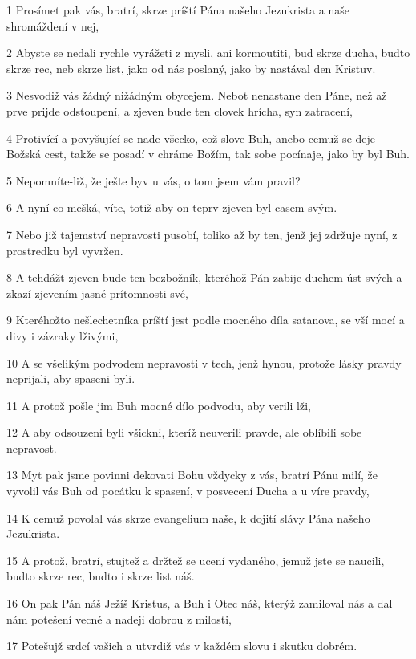 \par 1 Prosímet pak vás, bratrí, skrze príští Pána našeho Jezukrista a naše shromáždení v nej,
\par 2 Abyste se nedali rychle vyrážeti z mysli, ani kormoutiti, bud skrze ducha, budto skrze rec, neb skrze list, jako od nás poslaný, jako by nastával den Kristuv.
\par 3 Nesvodiž vás žádný nižádným obycejem. Nebot nenastane den Páne, než až prve prijde odstoupení, a zjeven bude ten clovek hrícha, syn zatracení,
\par 4 Protivící a povyšující se nade všecko, což slove Buh, anebo cemuž se deje Božská cest, takže se posadí v chráme Božím, tak sobe pocínaje, jako by byl Buh.
\par 5 Nepomníte-liž, že ješte byv u vás, o tom jsem vám pravil?
\par 6 A nyní co mešká, víte, totiž aby on teprv zjeven byl casem svým.
\par 7 Nebo již tajemství nepravosti pusobí, toliko až by ten, jenž jej zdržuje nyní, z prostredku byl vyvržen.
\par 8 A tehdážt zjeven bude ten bezbožník, kteréhož Pán zabije duchem úst svých a zkazí zjevením jasné prítomnosti své,
\par 9 Kteréhožto nešlechetníka príští jest podle mocného díla satanova, se vší mocí a divy i zázraky lživými,
\par 10 A se všelikým podvodem nepravosti v tech, jenž hynou, protože lásky pravdy neprijali, aby spaseni byli.
\par 11 A protož pošle jim Buh mocné dílo podvodu, aby verili lži,
\par 12 A aby odsouzeni byli všickni, kteríž neuverili pravde, ale oblíbili sobe nepravost.
\par 13 Myt pak jsme povinni dekovati Bohu vždycky z vás, bratrí Pánu milí, že vyvolil vás Buh od pocátku k spasení, v posvecení Ducha a u víre pravdy,
\par 14 K cemuž povolal vás skrze evangelium naše, k dojití slávy Pána našeho Jezukrista.
\par 15 A protož, bratrí, stujtež a držtež se ucení vydaného, jemuž jste se naucili, budto skrze rec, budto i skrze list náš.
\par 16 On pak Pán náš Ježíš Kristus, a Buh i Otec náš, kterýž zamiloval nás a dal nám potešení vecné a nadeji dobrou z milosti,
\par 17 Potešujž srdcí vašich a utvrdiž vás v každém slovu i skutku dobrém.

